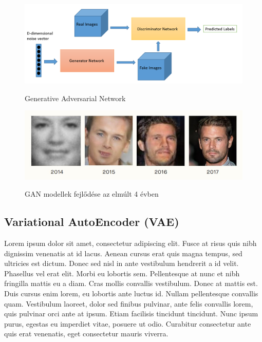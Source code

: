 \documentclass[12pt]{article}
\begin{document}
\begin{figure}[h!]
\begin{center}
  \label{gan}
  \includegraphics[width=\linewidth]{gan.png}
  \caption{Generative Adversarial Network}
\end{center}
\end{figure}

\begin{figure}[h!]
\begin{center}
  \label{gan_progress}
  \includegraphics[width=\linewidth]{gan_progress.jpg}
  \caption{GAN modellek fejlődése az elmúlt 4 évben}
\end{center}
\end{figure}

\subsection{Variational AutoEncoder (VAE)}

Lorem ipsum dolor sit amet, consectetur adipiscing elit. Fusce at risus quis nibh dignissim venenatis at id lacus. Aenean cursus erat quis magna tempus, sed ultricies est dictum. Donec sed nisl in ante vestibulum hendrerit a id velit. Phasellus vel erat elit. Morbi eu lobortis sem. Pellentesque at nunc et nibh fringilla mattis eu a diam. Cras mollis convallis vestibulum. Donec at mattis est. Duis cursus enim lorem, eu lobortis ante luctus id. Nullam pellentesque convallis quam. Vestibulum laoreet, dolor sed finibus pulvinar, ante felis convallis lorem, quis pulvinar orci ante at ipsum. Etiam facilisis tincidunt tincidunt. Nunc ipsum purus, egestas eu imperdiet vitae, posuere ut odio. Curabitur consectetur ante quis erat venenatis, eget consectetur mauris viverra.
\end{document}
